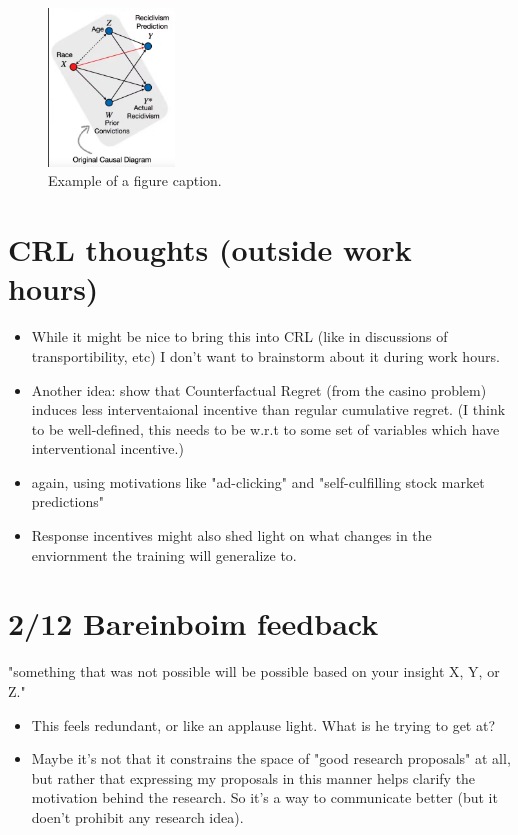 \documentclass[letterpaper,10pt]{article}
\begin{document}
\begin{figure}[htbp]
\centerline{\includegraphics[width=0.3\textwidth]{pics/Discrimination_in_COMPAS.png}}
\caption{Example of a figure caption.}
\label{fig}
\end{figure}




\newpage
\section{CRL thoughts (outside work hours)}
\begin{itemize}
  \item While it might be nice to bring this into CRL (like in discussions of transportibility, etc) I don't want to brainstorm about it during work hours.
  \item Another idea: show that Counterfactual Regret (from the casino problem) induces less interventaional incentive than regular cumulative regret. (I think to be well-defined, this needs to be w.r.t to some set of variables which have interventional incentive.)
  \item again, using motivations like "ad-clicking" and "self-culfilling stock market predictions"
  \item Response incentives might also shed light on what changes in the enviornment the training will generalize to.
\end{itemize}







\newpage

\section{2/12 Bareinboim feedback}

"something that was not possible will be possible based on your insight X, Y, or Z."
\begin{itemize}
  \item This feels redundant, or like an applause light. What is he trying to get at?
  \item Maybe it's not that it constrains the space of "good research proposals" at all, but rather that expressing my proposals in this manner helps clarify the motivation behind the research. So it's a way to communicate better (but it doen't prohibit any research idea).
\end{itemize}
\end{document}
